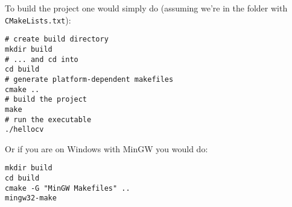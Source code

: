 To build the project one would simply do (assuming we're in the folder with \lstinline|CMakeLists.txt|):

\lstset{
	language=sh,
}
\begin{lstlisting}
# create build directory 
mkdir build
# ... and cd into
cd build
# generate platform-dependent makefiles
cmake ..
# build the project
make
# run the executable
./hellocv
\end{lstlisting}

Or if you are on Windows with MinGW you would do:

\begin{lstlisting}
mkdir build
cd build
cmake -G "MinGW Makefiles" ..
mingw32-make
\end{lstlisting}
